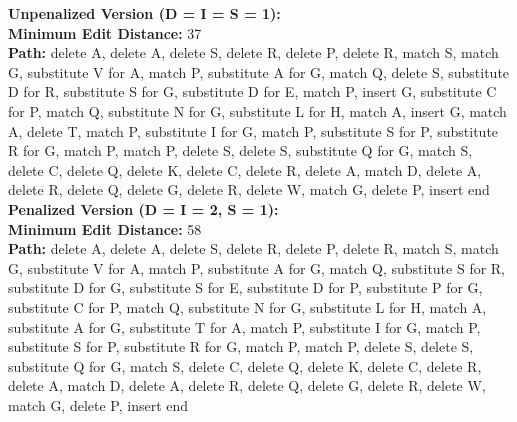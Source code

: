 \documentclass{article}
\begin{document}
\textbf{Unpenalized Version (D = I = S = 1):} \\
\textbf{Minimum Edit Distance:}  37 \\
\textbf{Path:}  delete A, delete A, delete S, delete R, delete P, delete R, match S, match G, substitute V for A, match P, substitute A for G, match Q, delete S, substitute D for R, substitute S for G, substitute D for E, match P, insert G, substitute C for P, match Q, substitute N for G, substitute L for H, match A, insert G, match A, delete T, match P, substitute I for G, match P, substitute S for P, substitute R for G, match P, match P, delete S, delete S, substitute Q for G, match S, delete C, delete Q, delete K, delete C, delete R, delete A, match D, delete A, delete R, delete Q, delete G, delete R, delete W, match G, delete P, insert end \\

\textbf{Penalized Version (D = I = 2, S = 1):} \\
\textbf{Minimum Edit Distance:}  58 \\
\textbf{Path:}  delete A, delete A, delete S, delete R, delete P, delete R, match S, match G, substitute V for A, match P, substitute A for G, match Q, substitute S for R, substitute D for G, substitute S for E, substitute D for P, substitute P for G, substitute C for P, match Q, substitute N for G, substitute L for H, match A, substitute A for G, substitute T for A, match P, substitute I for G, match P, substitute S for P, substitute R for G, match P, match P, delete S, delete S, substitute Q for G, match S, delete C, delete Q, delete K, delete C, delete R, delete A, match D, delete A, delete R, delete Q, delete G, delete R, delete W, match G, delete P, insert end \\


\end{document}
